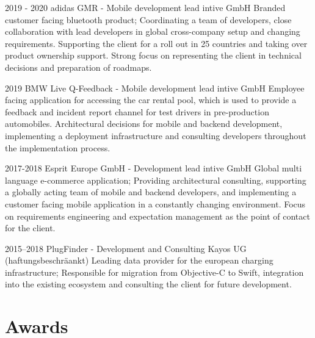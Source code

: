 \documentclass[]{friggeri-cv} %
\begin{document}
\begin{entrylist}
	
	\entry
	{2019 - 2020}
	{adidas GMR - Mobile development lead}
	{intive GmbH}
	{Branded customer facing bluetooth product; Coordinating a team of developers, close collaboration with lead developers in global cross-company setup and changing requirements. Supporting the client for a roll out in 25 countries and taking over product ownership support. Strong focus on representing the client in technical decisions and preparation of roadmaps.}
	
	
	
	\entry
	{2019}
	{BMW Live Q-Feedback - Mobile development lead}
	{intive GmbH}
	{Employee facing application for accessing the car rental pool, which is used to provide a feedback and incident report channel for test drivers in pre-production automobiles. Architectural decisions for mobile and backend development, implementing a deployment infrastructure and consulting developers throughout the implementation process.}
	
	
	\entry
	{2017-2018}
	{Esprit Europe GmbH - Development lead}
	{intive GmbH}
	{Global multi language e-commerce application; Providing architectural consulting, supporting a globally acting team of mobile and backend developers, and implementing a customer facing mobile application in a constantly changing environment. Focus on requirements engineering and expectation management as the point of contact for the client.}
	
	
	\entry
	{2015--2018}
	{PlugFinder - Development and Consulting}
	{Kayos UG (haftungsbeschr\"{a}ankt)}
	{Leading data provider for the european charging infrastructure; Responsible for migration from Objective-C to Swift, integration into the existing ecosystem and consulting the client for future development.}

\end{entrylist}


\section{Awards}
\end{document}
